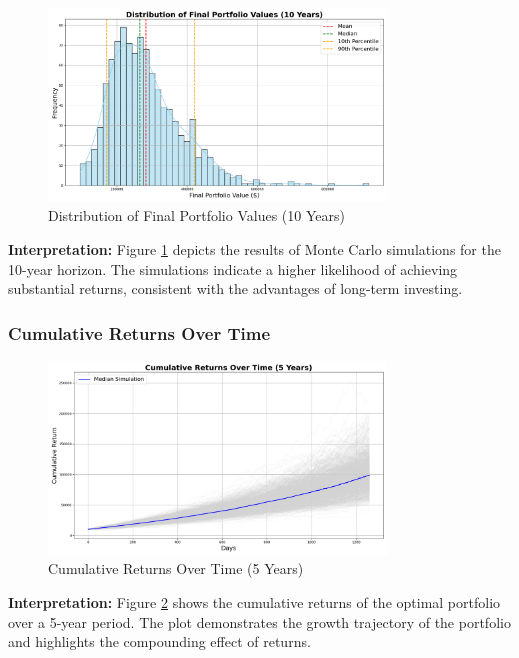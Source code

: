 \begin{figure}[!htbp]
    \centering
    \includegraphics[width=0.8\textwidth]{../Figures/final_portfolio_values_distribution_10_years.png}
    \caption{Distribution of Final Portfolio Values (10 Years)}
    \label{fig:final_portfolio_values_10y}
\end{figure}

\textbf{Interpretation:} Figure \ref{fig:final_portfolio_values_10y} depicts the results of Monte Carlo simulations for the 10-year horizon. The simulations indicate a higher likelihood of achieving substantial returns, consistent with the advantages of long-term investing.

\subsubsection{Cumulative Returns Over Time}
\begin{figure}[!htbp]
    \centering
    \includegraphics[width=0.8\textwidth]{../Figures/cumulative_returns_over_time_5_years.png}
    \caption{Cumulative Returns Over Time (5 Years)}
    \label{fig:cumulative_returns_5y}
\end{figure}

\textbf{Interpretation:} Figure \ref{fig:cumulative_returns_5y} shows the cumulative returns of the optimal portfolio over a 5-year period. The plot demonstrates the growth trajectory of the portfolio and highlights the compounding effect of returns.

